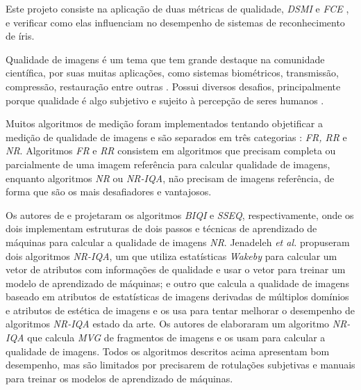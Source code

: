 \par Este projeto consiste na aplicação de duas métricas de qualidade, \textit{\acrfull{DSMI}} \cite{Jenadeleh_2018_CVPR_Workshops} e \textit{\acrfull{FCE}} \cite{du2010}, e verificar como elas influenciam no desempenho de sistemas de reconhecimento de íris.

\par Qualidade de imagens é um tema que tem grande destaque na comunidade científica, por suas muitas aplicações, como sistemas biométricos, transmissão, compressão, restauração entre outras \cite{zhang2015}. Possui diversos desafios, principalmente porque qualidade é algo subjetivo e sujeito à percepção de seres humanos \cite{xu2016}. 

\par Muitos algoritmos de medição foram implementados tentando objetificar a medição de qualidade de imagens e são separados em três categorias \cite{xu2016}: \textit{\acrfull{FR}, \acrfull{RR}} e \textit{\acrfull{NR}}. Algoritmos \textit{\acrshort{FR}} e \textit{RR} consistem em algoritmos que precisam completa ou parcialmente de uma imagem referência para calcular qualidade de imagens, enquanto algoritmos \textit{\acrshort{NR}} ou \textit{\acrfull{NR-IQA}}, não precisam de imagens referência, de forma que são os mais desafiadores e vantajosos. 

\par Os autores de \cite{moorthy2010} e \cite{liu2014} projetaram os algoritmos \textit{\acrfull{BIQI}} e \textit{\acrfull{SSEQ}}, respectivamente, onde os dois implementam estruturas de dois passos e técnicas de aprendizado de máquinas para calcular a qualidade de imagens \textit{\acrshort{NR}}. Jenadeleh \textit{et al.} \cite{jenadeleh2016, jenadeleh2017} propuseram dois algoritmos \textit{\acrshort{NR-IQA}}, um que utiliza estatísticas \textit{Wakeby} para calcular um vetor de atributos com informações de qualidade e usar o vetor para treinar um modelo de aprendizado de máquinas; e outro que calcula a qualidade de imagens baseado em atributos de estatísticas de imagens derivadas de múltiplos domínios e atributos de estética de imagens e os usa para tentar melhorar o desempenho de algoritmos \textit{\acrshort{NR-IQA}} estado da arte. Os autores de \cite{zhang2015} elaboraram um algoritmo \textit{\acrshort{NR-IQA}} que calcula \textit{\acrfull{MVG}} de fragmentos de imagens e os usam para calcular a qualidade de imagens. Todos os algoritmos descritos acima apresentam bom desempenho, mas são limitados por precisarem de rotulações subjetivas e manuais para treinar os modelos de aprendizado de máquinas.

